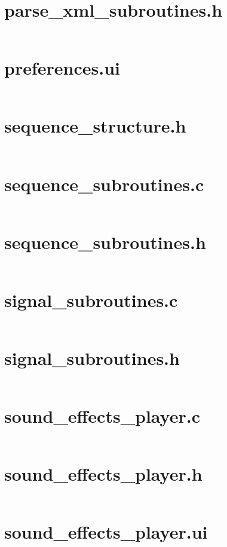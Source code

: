 \documentclass[letterpaper,twoside]{article}
\begin{document}
\section{parse\_xml\_subroutines.h}
\inputminted[breaklines]{c}{../src/parse_xml_subroutines.h}
\newpage
\section{preferences.ui}
\inputminted[breaklines]{xml}{../src/preferences.ui}
\newpage
\section{sequence\_structure.h}
\inputminted[breaklines]{c}{../src/sequence_structure.h}
\newpage
\section{sequence\_subroutines.c}
\inputminted[breaklines]{c}{../src/sequence_subroutines.c}
\newpage
\section{sequence\_subroutines.h}
\inputminted[breaklines]{c}{../src/sequence_subroutines.h}
\newpage
\section{signal\_subroutines.c}
\inputminted[breaklines]{c}{../src/signal_subroutines.c}
\newpage
\section{signal\_subroutines.h}
\inputminted[breaklines]{c}{../src/signal_subroutines.h}
\newpage
\section{sound\_effects\_player.c}
\inputminted[breaklines]{c}{../src/sound_effects_player.c}
\newpage
\section{sound\_effects\_player.h}
\inputminted[breaklines]{c}{../src/sound_effects_player.h}
\newpage
\section{sound\_effects\_player.ui}
\inputminted[breaklines]{c}{../src/sound_effects_player.ui}
\newpage
\end{document}
